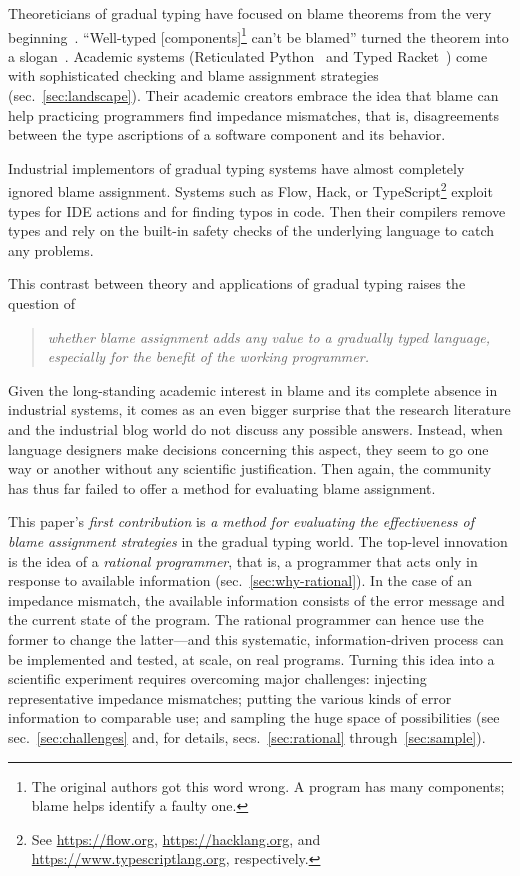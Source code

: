 
Theoreticians of gradual typing have focused on blame theorems from the
very beginning~\citep{mf-toplas-2009, tf-dls-2006}. ``Well-typed
[components]\footnote{The original authors got this word wrong. A program has many components; blame helps identify a faulty one.} can't be
blamed'' turned the theorem into a slogan~\citep{wf-esop-2009}. Academic
systems (Reticulated Python~\citep{vsc-dls-2019, vss-popl-2017,
vksb-dls-2014} and Typed
Racket~\citep{tf-dls-2006,tf-popl-2008,tfffgksst-snapl-2017,tf-icfp-2010})
come with sophisticated checking and blame assignment strategies
(sec.~\ref{sec:landscape}). Their academic creators embrace the idea that
blame can help practicing programmers find impedance mismatches, that is,
disagreements between the type ascriptions of a software component and its
behavior.

Industrial implementors of gradual typing systems have almost
completely ignored blame assignment.  Systems such as Flow, Hack, or
TypeScript\footnote{See \url{https://flow.org},
\url{https://hacklang.org}, and \url{https://www.typescriptlang.org},
respectively.} exploit types for IDE actions and for finding typos in
code. Then their compilers remove types and rely on the built-in
safety checks of the underlying language to catch any problems.

This contrast between theory and applications of gradual typing raises the question of
\begin{quote}
 \it
 whether blame assignment adds any value to a gradually typed language,
 especially for the benefit of the working programmer.
\end{quote}
Given the long-standing academic interest in blame and its complete absence in
industrial systems, it comes as an even bigger surprise that the research
literature and the industrial blog world do not discuss any possible answers.
Instead, when language designers make decisions concerning this aspect, they seem
to go one way or another without any scientific justification. Then again, the
community has thus far failed to offer a method for evaluating blame assignment.

This paper's {\em first contribution\/} is {\em a method for evaluating the
effectiveness of blame assignment strategies\/} in the gradual typing world.
The top-level innovation is the idea of a {\em rational programmer\/}, that is,
a programmer that acts only in response to available information
(sec.~\ref{sec:why-rational}). In the case of an impedance mismatch, the
available information consists of the error message and the current state of the
program. The rational programmer can hence use the former to change the
latter---and this systematic, information-driven process can be implemented and
tested, at scale, on real programs.  Turning this idea into a scientific
experiment requires overcoming major challenges: injecting representative
impedance mismatches; putting the various kinds of error information to
comparable use; and sampling the huge space of possibilities (see
sec.~\ref{sec:challenges} and, for details, secs.~\ref{sec:rational} through~\ref{sec:sample}).

